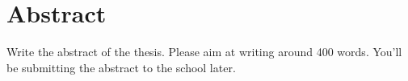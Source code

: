 \chapter*{Abstract}
\setcounter{page}{1}

Write the abstract of the thesis.
Please aim at writing around 400 words.
You'll be submitting the abstract to the school later.